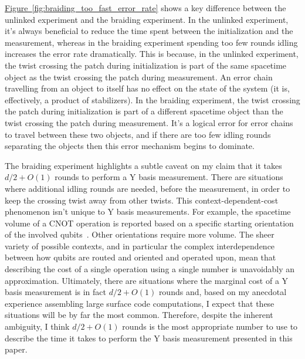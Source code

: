 \documentclass[onecolumn,unpublished,a4paper]{quantumarticle}
\theoremstyle{definition}
\theoremstyle{definition}
\theoremstyle{definition}
\newcommand{\fig}[1]{\hyperref[fig:#1]{Figure~\ref*{fig:#1}}}
\begin{document}
\fig{braiding_too_fast_error_rate} shows a key difference between the unlinked experiment and the braiding experiment.
In the unlinked experiment, it's always beneficial to reduce the time spent between the initialization and the measurement, whereas in the braiding experiment spending too few rounds idling increases the error rate dramatically.
This is because, in the unlinked experiment, the twist crossing the patch during initialization is part of the same spacetime object as the twist crossing the patch during measurement.
An error chain travelling from an object to itself has no effect on the state of the system (it is, effectively, a product of stabilizers).
In the braiding experiment, the twist crossing the patch during initialization is part of a different spacetime object than the twist crossing the patch during measurement.
It's a logical error for error chains to travel between these two objects, and if there are too few idling rounds separating the objects then this error mechanism begins to dominate.

The braiding experiment highlights a subtle caveat on my claim that it takes $d/2 + O(1)$ rounds to perform a Y basis measurement.
There are situations where additional idling rounds are needed, before the measurement, in order to keep the crossing twist away from other twists.
This context-dependent-cost phenomenon isn't unique to Y basis measurements.
For example, the spacetime volume of a CNOT operation is reported based on a specific starting orientation of the involved qubits~\cite{horsman2012latticesurgery}.
Other orientations require more volume.
The sheer variety of possible contexts, and in particular the complex interdependence between how qubits are routed and oriented and operated upon, mean that describing the cost of a single operation using a single number is unavoidably an approximation.
Ultimately, there are situations where the marginal cost of a Y basis measurement is in fact $d/2 + O(1)$ rounds and, based on my anecdotal experience assembling large surface code computations, I expect that these situations will be by far the most common.
Therefore, despite the inherent ambiguity, I think $d/2 + O(1)$ rounds is the most appropriate number to use to describe the time it takes to perform the Y basis measurement presented in this paper.
\end{document}
